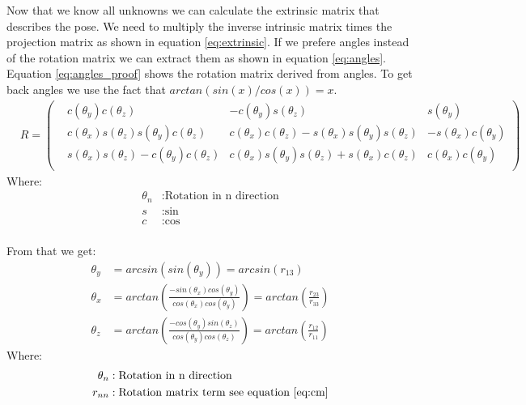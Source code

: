 \documentclass[11pt,a4paper,titlepage,oneside]{report}
\begin{document}
Now that we know all unknowns we can calculate the extrinsic matrix that describes the pose. We need to multiply the inverse intrinsic matrix times the projection matrix as shown in equation \ref{eq:extrinsic}. If we prefere angles instead of the rotation matrix we can extract them as shown in equation \ref{eq:angles}. Equation \ref{eq:angles_proof} shows the rotation matrix derived from angles. To get back angles we use the fact that $arctan(sin(x)/cos(x))=x$.
\begin{equation}\label{eq:angles_proof}
\begin{aligned}
	&R=\begin{pmatrix}
		&c(\theta_y)c(\theta_z) & -c(\theta_y)s(\theta_z) & s(\theta_y)\\
		&c(\theta_x)s(\theta_z)s(\theta_y)c(\theta_z) & c(\theta_x)c(\theta_z)-s(\theta_x)s(\theta_y)s(\theta_z) & -s(\theta_x)c(\theta_y)\\
		&s(\theta_x)s(\theta_z)-c(\theta_y)c(\theta_z) & c(\theta_x)s(\theta_y)s(\theta_z)+s(\theta_x)c(\theta_z) &	c(\theta_x)c(\theta_y)\\
	\end{pmatrix}
\end{aligned}
\end{equation}
Where:
\begin{align*}
	\theta_n	&: \text{Rotation in n direction}\\
	s				  &: \text{sin}\\
	c				  &: \text{cos}\\
\end{align*}

From that we get:
\begin{equation}\label{eq:angles}
\begin{aligned}
	\theta_y &= arcsin(sin(\theta_y)) = arcsin(r_{13})\\
	\theta_x &= arctan(\frac{-sin(\theta_x)cos(\theta_y)}{cos(\theta_x)cos(\theta_y)}) = arctan(\frac{r_{23}}{r_{33}})\\
	\theta_z &= arctan(\frac{-cos(\theta_y)sin(\theta_z)}{cos(\theta_y)cos(\theta_z)}) = arctan(\frac{r_{12}}{r_{11}}) 
\end{aligned}
\end{equation}
Where:
\begin{align*}
	\theta_n	&: \text{Rotation in n direction}\\
	r_{nn}	  &: \text{Rotation matrix term see equation \ref{eq:cm}}\\
\end{align*}
\end{document}
